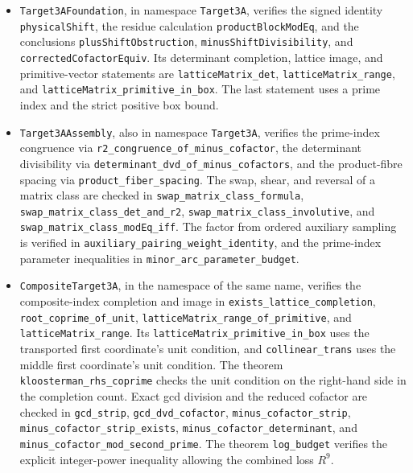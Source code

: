 \documentclass[11pt]{amsart}
\numberwithin{equation}{section}
\theoremstyle{remark}
\begin{document}
\begin{itemize}
\item \texttt{Target3AFoundation}, in namespace \texttt{Target3A},
  verifies the signed identity \texttt{physicalShift}, the residue
  calculation \texttt{productBlockModEq}, and the conclusions
  \texttt{plusShiftObstruction}, \texttt{minusShiftDivisibility},
  and \texttt{correctedCofactorEquiv}. Its determinant completion,
  lattice image, and primitive-vector statements are
  \nolinkurl{latticeMatrix_det}, \nolinkurl{latticeMatrix_range}, and
  \nolinkurl{latticeMatrix_primitive_in_box}. The last statement
  uses a prime index and the strict positive box bound.
\item \texttt{Target3AAssembly}, also in namespace \texttt{Target3A},
  verifies the prime-index congruence via
  \nolinkurl{r2_congruence_of_minus_cofactor}, the determinant
  divisibility via \nolinkurl{determinant_dvd_of_minus_cofactors},
  and the product-fibre spacing via \nolinkurl{product_fiber_spacing}.
  The swap, shear, and reversal of a matrix class are checked in
  \nolinkurl{swap_matrix_class_formula},
  \nolinkurl{swap_matrix_class_det_and_r2},
  \nolinkurl{swap_matrix_class_involutive}, and
  \nolinkurl{swap_matrix_class_modEq_iff}.
  The factor from ordered auxiliary sampling is verified in
  \nolinkurl{auxiliary_pairing_weight_identity}, and the
  prime-index parameter inequalities in
  \nolinkurl{minor_arc_parameter_budget}.
\item \texttt{CompositeTarget3A}, in the namespace of the same name,
  verifies the composite-index completion and image in
  \nolinkurl{exists_lattice_completion},
  \nolinkurl{root_coprime_of_unit},
  \nolinkurl{latticeMatrix_range_of_primitive}, and
  \nolinkurl{latticeMatrix_range}. Its
  \nolinkurl{latticeMatrix_primitive_in_box} uses the transported
  first coordinate's unit condition, and \nolinkurl{collinear_trans}
  uses the middle first coordinate's unit condition. The theorem
  \nolinkurl{kloosterman_rhs_coprime} checks the unit condition on
  the right-hand side in the completion count. Exact gcd division and
  the reduced cofactor are checked in \nolinkurl{gcd_strip},
  \nolinkurl{gcd_dvd_cofactor}, \nolinkurl{minus_cofactor_strip},
  \nolinkurl{minus_cofactor_strip_exists},
  \nolinkurl{minus_cofactor_determinant}, and
  \nolinkurl{minus_cofactor_mod_second_prime}. The theorem
  \nolinkurl{log_budget} verifies the explicit integer-power
  inequality allowing the combined loss \(R^9\).
\end{itemize}
\end{document}
